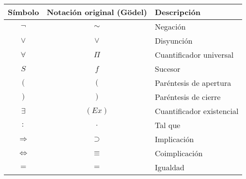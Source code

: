 \vfill
\begin{tabla}
\begin{table}[H]
\centering
\begin{tabular}{@{}ccl@{}}
\toprule
Símbolo & Notación original (Gödel) & Descripción \\ \midrule
$\neg$ & $\sim$ & Negación \\
$\vee$ & $\vee$ & Disyunción \\
$\forall$ & $\Pi$ & Cuantificador universal \\
$S$ & $f$ & Sucesor \\
$($ & $($ & Paréntesis de apertura \\
$)$ & $)$ & Paréntesis de cierre \\
$\exists$ & $(Ex)$ & Cuantificador existencial \\
$:$ & $\textbf{.}$ & Tal que \\
$\Rightarrow$ & $\supset$ & Implicación \\
$\iff$ & $\equiv$ & Coimplicación \\
$=$ & $=$ & Igualdad \\\bottomrule
\end{tabular}
\end{table}
\vspace{-8pt}
\caption{Correspondencia entre los símbolos usados en este trabajo y los símbolos usados originalmente por Gödel \cite{Godel1931}}
\label{tab:peano-simbolos}
\end{tabla}
\vfill
\endinput
